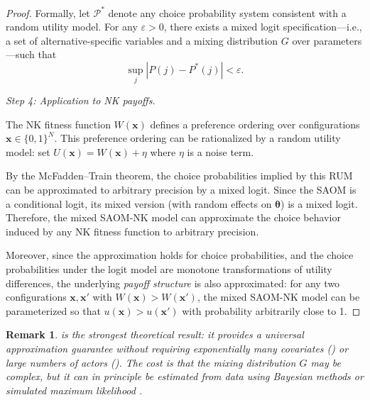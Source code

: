 \documentclass[12pt]{article}
\newtheorem{remark}{Remark}
\newcommand{\bx}{\mathbf{x}}
\newcommand{\btheta}{\boldsymbol{\theta}}
\begin{document}
\begin{proof}
Formally, let $\mathcal{P}^*$ denote any choice probability system consistent
with a random utility model. For any $\varepsilon > 0$, there exists a
mixed logit specification---i.e., a set of alternative-specific variables
and a mixing distribution $G$ over parameters---such that
\begin{equation*}
  \sup_j \left|P(j) - P^*(j)\right| < \varepsilon.
\end{equation*}

\medskip
\noindent\emph{Step 4: Application to NK payoffs.}

The NK fitness function $W(\bx)$ defines a preference ordering over
configurations $\bx \in \{0,1\}^N$. This preference ordering can be
rationalized by a random utility model: set $U(\bx) = W(\bx) + \eta$
where $\eta$ is a noise term.

By the McFadden--Train theorem, the choice probabilities implied by this
RUM can be approximated to arbitrary precision by a mixed logit. Since the
SAOM is a conditional logit, its mixed version (with random effects on
$\btheta$) is a mixed logit. Therefore, the mixed SAOM-NK model can
approximate the choice behavior induced by any NK fitness function to
arbitrary precision.

Moreover, since the approximation holds for choice probabilities, and
the choice probabilities under the logit model are monotone transformations
of utility differences, the underlying \emph{payoff structure} is also
approximated: for any two configurations $\bx, \bx'$ with
$W(\bx) > W(\bx')$, the mixed SAOM-NK model can be parameterized so that
$u(\bx) > u(\bx')$ with probability arbitrarily close to 1.
\end{proof}

\begin{remark}
 is the strongest theoretical result: it provides
a \emph{universal} approximation guarantee without requiring exponentially
many covariates () or large numbers of actors
(). The cost is that the mixing distribution
$G$ may be complex, but it can in principle be estimated from data using
Bayesian methods or simulated maximum likelihood
\citep{mcfadden2000mixed}.
\end{remark}
\end{document}
